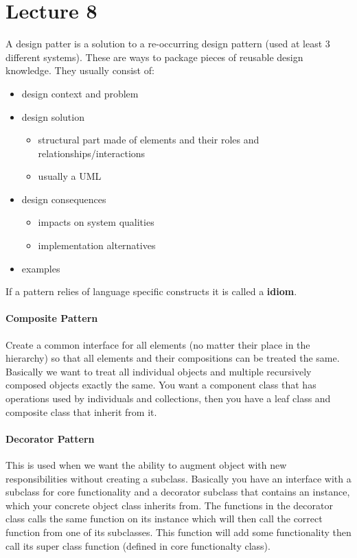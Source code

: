 \documentclass{article}
\begin{document}
\section*{Lecture 8} %
\label{sec:lecture_8}
A design patter is a solution to a re-occurring design pattern (used at least 3 different systems). These are ways to package pieces of reusable design knowledge. They usually consist of:
\begin{itemize}
    \item design context and problem
    \item design solution
    \begin{itemize}
        \item structural part made of elements and their roles and relationships/interactions
        \item usually a UML
    \end{itemize}
    \item design consequences
    \begin{itemize}
        \item impacts on system qualities
        \item implementation alternatives
    \end{itemize}
    \item examples
\end{itemize}

If a pattern relies of language specific constructs it is called a \textbf{idiom}.

\paragraph{Composite Pattern} %
\label{par:composite_pattern}
Create a common interface for all elements (no matter their place in the hierarchy) so that all elements and their compositions can be treated the same. Basically we want to treat all individual objects and multiple recursively composed objects exactly the same. You want a component class that has operations used by individuals and collections, then you have a leaf class and composite class that inherit from it.

\paragraph{Decorator Pattern} %
\label{par:decorator_pattern}
This is used when we want the ability to augment object with new responsibilities without creating a subclass. Basically you have an interface with a subclass for core functionality and a decorator subclass that contains an instance, which your concrete object class inherits from. The functions in the decorator class calls the same function on its instance which will then call the correct function from one of its subclasses. This function will add some functionality then call its super class function (defined in core functionalty class).
\end{document}
